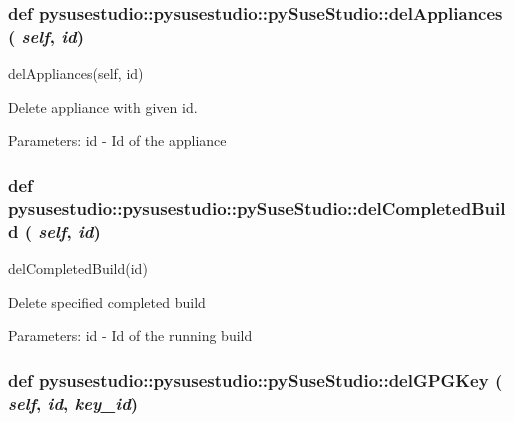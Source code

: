 \hypertarget{classpysusestudio_1_1pysusestudio_1_1py_suse_studio_a86def4a320f9963627271b4b573bba02}{
\subsubsection[{delAppliances}]{\setlength{\rightskip}{0pt plus 5cm}def pysusestudio::pysusestudio::pySuseStudio::delAppliances ( {\em self}, \/   {\em id})}}
\label{classpysusestudio_1_1pysusestudio_1_1py_suse_studio_a86def4a320f9963627271b4b573bba02}
\begin{DoxyVerb}delAppliances(self, id)

        Delete appliance with given id. 
            
            Parameters:
id - Id of the appliance

\end{DoxyVerb}
 \hypertarget{classpysusestudio_1_1pysusestudio_1_1py_suse_studio_adec3d908636c840428696373478916bb}{
\subsubsection[{delCompletedBuild}]{\setlength{\rightskip}{0pt plus 5cm}def pysusestudio::pysusestudio::pySuseStudio::delCompletedBuild ( {\em self}, \/   {\em id})}}
\label{classpysusestudio_1_1pysusestudio_1_1py_suse_studio_adec3d908636c840428696373478916bb}
\begin{DoxyVerb}delCompletedBuild(id)

            Delete specified completed build
            
            Parameters:
id - Id of the running build

\end{DoxyVerb}
 \hypertarget{classpysusestudio_1_1pysusestudio_1_1py_suse_studio_aca86db22c80d6e133b7f3524af48e4e5}{
\subsubsection[{delGPGKey}]{\setlength{\rightskip}{0pt plus 5cm}def pysusestudio::pysusestudio::pySuseStudio::delGPGKey ( {\em self}, \/   {\em id}, \/   {\em key\_\-id})}}

